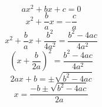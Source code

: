\documentclass{article}
\begin{document}
\[
ax^2+bx+c=0
\]
\[
x^2+\frac{b}{a}x=-\frac{c}{a}
\]
\[
x^2+\frac{b}{a}x+\frac{b^2}{4a^2}=\frac{b^2-4ac}{4a^2}
\]
\[
\left(x+\frac{b}{2a}\right)^2=\frac{b^2-4ac}{4a^2}
\]
\[
2ax+b=\pm\sqrt{b^2-4ac}
\]
\[
x=\frac{-b\pm\sqrt{b^2-4ac}}{2a}
\]
\end{document}
